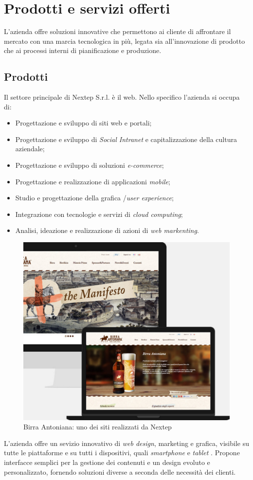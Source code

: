 \section{Prodotti e servizi offerti}

L'azienda offre soluzioni innovative che permettono ai cliente di affrontare il mercato con una marcia tecnologica in più, legata sia all'innovazione di prodotto che ai processi interni di pianificazione e produzione.

\subsection{Prodotti}

Il settore principale di Nextep S.r.l. è il web. Nello specifico l'azienda si occupa di:
\begin{itemize}
	\item Progettazione e sviluppo di siti web e portali;
	\item Progettazione e sviluppo di \textit{Social Intranet }e capitalizzazione della cultura aziendale;
	\item Progettazione e sviluppo di soluzioni \textit{e-commerce};
	\item Progettazione e realizzazione di applicazioni \textit{mobile};
	\item Studio e progettazione della grafica /\textit{user experience};
	\item Integrazione con tecnologie e servizi di \textit{cloud computing};
	\item Analisi, ideazione e realizzazione di azioni di \textit{web markenting}.
\end{itemize}

\begin{figure}[h]
\centering
\includegraphics[width=0.5\linewidth]{immagini/sito}
\caption[Birra Antoniana: uno dei siti realizzati da Nextep]{Birra Antoniana: uno dei siti realizzati da Nextep}
\label{fig:sito}
\end{figure}
L'azienda offre un sevizio innovativo di \textit{web design}, marketing e grafica, visibile su tutte le piattaforme e su tutti i dispositivi, quali \textit{smartphone} e \textit{tablet} . Propone interfacce semplici per la gestione dei contenuti e un design evoluto e personalizzato, fornendo soluzioni diverse a seconda delle necessità dei clienti.


